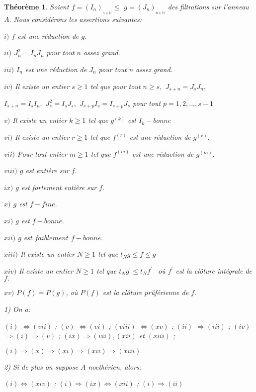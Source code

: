 \documentclass[12pt, a4paper, oneside]{article}
\newtheorem{montheoreme}{Théorème}
\begin{document}
	\begin{montheoreme}
		Soient $f=(I_{n})_{_{n\in \mathbb{N}}}\leq $ $g=(J_{n})_{_{n\in \mathbb{N}}}$ des filtrations sur l'anneau $A.$ Nous
		considérons les assertions suivantes:
		
		$i)$ $f$ est une réduction de $g.$
		
		$ii)$ $J_{n}^{2}=I_{n}J_{n}$ pour tout $n$ assez grand.
		
		$iii)$ $I_{n}$ est une réduction de $J_{n}$ pour tout $n$ assez grand.
		
		$iv)$ Il existe un entier $s\geq 1$ tel que pour tout $n\geq s,$ $J_{s+n}=J_{s}J_{n},$
		
		$I_{s+n}=I_{s}I_{n},$ $J_{s}^{2}=I_{s}J_{s},$ $J_{s+p}I_{s}=I_{s+p}J_{s}$ pour tout $p=1,2,...,s-1$
		
		$v)$ Il existe un entier $k\geq 1$ tel que $g^{(k)}$ est $I_{k}-bonne$
		
		$vi)$ Il existe un entier $r\geq 1$ tel que $f^{(r)}$ est une réduction de $g^{(r)}.$
		
		$vii)$ Pour tout entier $m\geq 1$ tel que $f^{(m)}$ est une réduction de $g^{(m)}.$
		
		$viii)$ $g$ est entière sur $f.$
		
		$ix)$ $g$ est fortement entière sur $f.$
		
		$x)$ $g$ est $f-fine.$
		
		$xi)$ $g$ est $f-bonne.$
		
		$xii)$ $g$ est $faiblement$ $f-bonne.$
		
		$xiii)$ Il existe un entier $N\geq 1$ tel que $t_{N}g\leq f\leq g$
		
		$xiv)$ Il existe un entier $N\geq 1$ tel que $t_{N}g^{\prime }\leq
		t_{N}f^{\prime \text{ }}$ où $f^{\prime }$ est la clôture intégrale de $f.$
		
		$xv)$ $P(f)=P(g)$, où $P(f)$ est la clôture prüférienne de $f.$
		
		1) On a:
		
		$(i)$ $\Longleftrightarrow (vii)$ ; $(v)$ $\Longleftrightarrow (vi)$ ; $(viii)$ $\Longleftrightarrow (xv)$ ; $(ii)$ $\Longrightarrow (iii)$ ; $(iv)$ 
		$\Longrightarrow (i)\Longrightarrow (v)$ ; $(ix)\Longrightarrow (vii),(xii)$
		et $(xiii)$ ;
		
		$(i)\Longrightarrow (x)\Longrightarrow (xi)\Longrightarrow
		(xii)\Longrightarrow (xiii)$
		
		2) Si de plus on suppose $A$ noethérien, alors:
		
		$(i)\Longleftrightarrow (xiv)$ ; $(i)\Longrightarrow (ix)\Longleftrightarrow
		(xii)$ ; $(i)\Longrightarrow (ii)$
		

\end{montheoreme}
\end{document}
